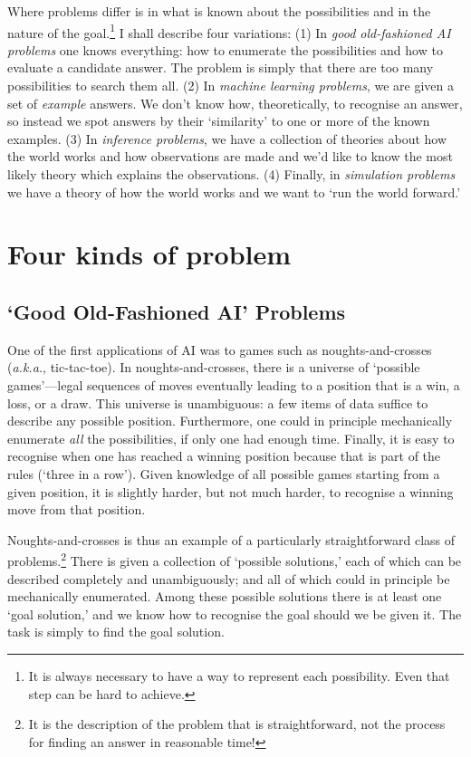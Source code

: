 \documentclass[10pt, a4, twocolumn]{article}
\begin{document}
Where problems differ is in what is known about the possibilities and in the
nature of the goal.\footnote{It is always necessary to have a way to represent
each possibility. Even that step can be hard to achieve.} I shall describe four
variations: (1) In \emph{good old-fashioned AI problems} one knows everything:
how to enumerate the possibilities and how to evaluate a candidate answer. The
problem is simply that there are too many possibilities to search them all. (2)
In \emph{machine learning problems}, we are given a set of \emph{example}
answers. We don't know how, theoretically, to recognise an answer, so instead we
spot answers by their `similarity' to one or more of the known examples. (3) In
\emph{inference problems}, we have a collection of theories about how the world
works and how observations are made and we'd like to know the most likely theory
which explains the observations. (4) Finally, in \emph{simulation problems} we
have a theory of how the world works and we want to `run the world forward.'

\section{Four kinds of problem}

\subsection{`Good Old-Fashioned AI' Problems}

One of the first applications of AI was to games such as noughts-and-crosses
(\emph{a.k.a.}, tic-tac-toe). In noughts-and-crosses, there is a universe of
`possible games'---legal sequences of moves eventually leading to a position that
is a win, a loss, or a draw. This universe is unambiguous: a few items of data
suffice to describe any possible position. Furthermore, one could in principle
mechanically enumerate \emph{all} the possibilities, if only one had enough
time. Finally, it is easy to recognise when one has reached a winning position
because that is part of the rules (`three in a row'). Given knowledge of all
possible games starting from a given position, it is slightly harder, but not
much harder, to recognise a winning move from that position.

Noughts-and-crosses is thus an example of a particularly straightforward class
of problems.\footnote{It is the description of the problem that is
straightforward, not the process for finding an answer in reasonable time!}
There is given a collection of `possible solutions,' each of which can be
described completely and unambiguously; and all of which could in principle be
mechanically enumerated. Among these possible solutions there is at least one
`goal solution,' and we know how to recognise the goal should we be given
it. The task is simply to find the goal solution.
\end{document}
